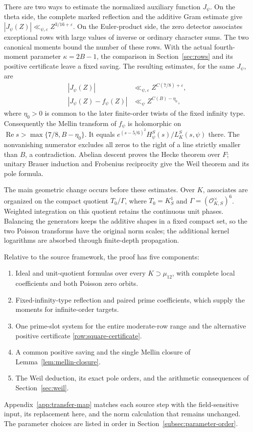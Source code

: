 \documentclass[11pt,a4paper]{article}
\numberwithin{equation}{section}
\theoremstyle{definition}
\theoremstyle{remark}
\newcommand{\eps}{\varepsilon}
\newcommand{\Rea}{\operatorname{Re}}
\begin{document}
There are two ways to estimate the normalized auxiliary function
$J_\psi$. On the theta side, the complete marked reflection and the
additive Gram estimate give
$|J_\psi(Z)|\ll_{\psi,\eps}Z^{3/16+\eps}$.
On the Euler-product side, the zero detector associates exceptional
rows with large values of inverse or ordinary character sums.
The two canonical moments bound the number of these rows. With the
actual fourth-moment parameter $\kappa=2B-1$, the comparison in
Section~\ref{sec:rows} and its positive certificate leave a fixed
saving. The resulting estimates, for the same $J_\psi$, are
\[
 \begin{aligned}
 |J_\psi(Z)|&\ll_{\psi,\eps}Z^{C(7/8)+\eps},\\
 |J_\psi(Z)-f_\psi(Z)|&\ll_\psi Z^{C(B)-\eta_0},
 \end{aligned}
\]
where $\eta_0>0$ is common to the later finite-order twists of the
fixed infinity type. Consequently the Mellin transform of $f_\psi$
is holomorphic on $\Rea s>\max\{7/8,B-\eta_0\}$. It equals
$e^{(s-5/6)^2}H_\psi^S(s)/L_K^S(s,\psi)$ there. The nonvanishing
numerator excludes all zeros to the right of a line strictly smaller
than $B$, a contradiction. Abelian descent proves the Hecke theorem
over $F$; unitary Brauer induction and Frobenius reciprocity give the
Weil theorem and its pole formula.

The main geometric change occurs before these estimates. Over $K$,
associates are organized on the compact quotient
$T_0/\Gamma$, where $T_0=K_S^1$ and
$\Gamma=(\mathcal O_{K,S}^{\times})^6$. Weighted integration on this
quotient retains the continuous unit phases. Balancing the generators
keeps the additive shapes in a fixed compact set, so the two Poisson
transforms have the original norm scales; the additional kernel
logarithms are absorbed through finite-depth propagation.

Relative to the source framework, the proof has five components:
\begin{enumerate}[label=\textup{(\alph*)},leftmargin=*,itemsep=2pt]
\item Ideal and unit-quotient formulas over every $K\supset\mu_{12}$,
with complete local coefficients and both Poisson zero orbits.
\item Fixed-infinity-type reflection and paired prime coefficients,
which supply the moments for infinite-order targets.
\item One prime-slot system for the entire moderate-row range and the
alternative positive certificate \eqref{row:square-certificate}.
\item A common positive saving and the single Mellin closure of
Lemma~\ref{lem:mellin-closure}.
\item The Weil deduction, its exact pole orders, and the arithmetic
consequences of Section~\ref{sec:weil}.
\end{enumerate}
Appendix~\ref{app:transfer-map} matches each source step with the
field-sensitive input, its replacement here, and the norm calculation
that remains unchanged. The parameter choices are listed in order in
Section~\ref{subsec:parameter-order}.
\end{document}
